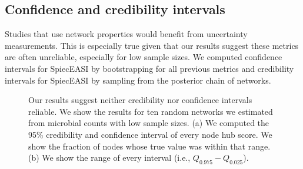 \documentclass[
  a4paper,
]{article}
\begin{document}
\hypertarget{confidence-and-credibility-intervals}{%
\subsection{Confidence and credibility
intervals}\label{confidence-and-credibility-intervals}}

Studies that use network properties would benefit from uncertainty
measurements. This is especially true given that our results suggest
these metrics are often unreliable, especially for low sample sizes. We
computed confidence intervals for SpiecEASI by bootstrapping for all
previous metrics and credibility intervals for SpiecEASI by sampling
from the posterior chain of networks.

\begin{figure}

\begin{minipage}[t]{\linewidth}

{\centering 


}

\end{minipage}%
\newline
\begin{minipage}[t]{\linewidth}

{\centering 


}

\end{minipage}%

\caption{\label{fig-intervals}Our results suggest neither credibility
nor confidence intervals reliable. We show the results for ten random
networks we estimated from microbial counts with low sample sizes. (a)
We computed the 95\% credibility and confidence interval of every node
hub score. We show the fraction of nodes whose true value was within
that range. (b) We show the range of every interval (i.e.,
\(Q_{0.975} - Q_{0.025}\)).}

\end{figure}
\end{document}
